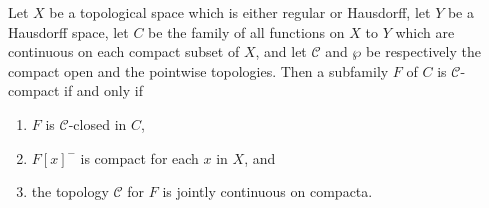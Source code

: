 Let $X$ be a topological space which is either regular or Hausdorff, let $Y$ be a Hausdorff space, let $C$ be the family of all functions on $X$ to $Y$ which are continuous on each compact subset of $X$, and let $\mathcal{C}$ and $\wp$ be respectively the compact open and the pointwise topologies. Then a subfamily $F$ of $C$ is $\mathcal{C}$-compact if and only if

\begin{enumerate}
\item[(a)] $F$ is $\mathcal{C}$-closed in $C$,
\item[(b)] $F[x]^{-}$ is compact for each $x$ in $X$, and
\item[(c)] the topology $\mathcal{C}$ for $F$ is jointly continuous on compacta.
\end{enumerate}
